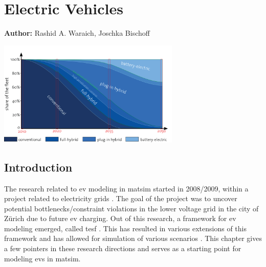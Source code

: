 \chapter{Electric Vehicles}
\label{ch:elvehicles}

\hfill \textbf{Author:} Rashid A. Waraich, Joschka Bischoff

\begin{center} \includegraphics[width=0.65\textwidth, angle=0]{extending/figures/Elvehicles/main.png} \end{center}


\section{Introduction}
The research related to \gls{ev} modeling in \gls{matsim} started in 2008/2009, within a project related to electricity grids \citep[][]{WaraichEtAl_IATBR_2009, WaraichEtAl_TRR_2013}. The goal of the project was to uncover potential bottlenecks/constraint violations in the lower voltage grid in the city of Zürich due to future \gls{ev} charging. Out of this research, a framework for \gls{ev} modeling emerged, called \gls{tesf} \citep[][]{WaraichEtAl_JanssensEtAl_2014}. This has resulted in various extensions of this framework and has allowed for simulation of various scenarios \citep[][]{WaraichEtAl_JanssensEtAl_2014, Waraich_PhDThesis_2014, AbedinWaraich_JSDEWES_2014, Schieffer_MastersThesis_2011, GalusAndersson_CIGRE_2011, GalusEtAl_ResRep_EWZ_2012, Bischoff2013MaTaxis, BischoffMaciejewskiEcabMielecMobilTUM}. This chapter gives a few pointers in these research directions and serves as a starting point for modeling \glspl{ev} in \gls{matsim}.

